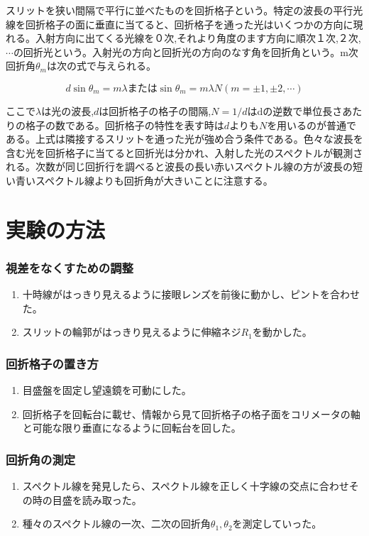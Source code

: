 \documentclass{jsarticle}
\begin{document}
スリットを狭い間隔で平行に並べたものを回折格子という。特定の波長の平行光線を回折格子の面に垂直に当てると、回折格子を通った光はいくつかの方向に現れる。入射方向に出てくる光線を０次,それより角度のます方向に順次１次,２次,$\cdots$の回折光という。入射光の方向と回折光の方向のなす角を回折角という。m次回折角$\theta_m$は次の式で与えられる。

\begin{equation}
    d\sin{\theta_m} = m\lambda または \sin{\theta_m} = m\lambda N (m = \pm 1,\pm 2, \cdots)
\end{equation}

ここで$\lambda$は光の波長,$d$は回折格子の格子の間隔,$N = 1/d$はdの逆数で単位長さあたりの格子の数である。回折格子の特性を表す時は$d$よりも$N$を用いるのが普通である。上式は隣接するスリットを通った光が強め合う条件である。色々な波長を含む光を回折格子に当てると回折光は分かれ、入射した光のスペクトルが観測される。次数が同じ回折行を調べると波長の長い赤いスペクトル線の方が波長の短い青いスペクトル線よりも回折角が大きいことに注意する。



\section{実験の方法}

\subsubsection{視差をなくすための調整}
\begin{enumerate}
    \item 十時線がはっきり見えるように接眼レンズを前後に動かし、ピントを合わせた。
    \item スリットの輪郭がはっきり見えるように伸縮ネジ$R_1$を動かした。
\end{enumerate}

\subsubsection{回折格子の置き方}
\begin{enumerate}
    \item 目盛盤を固定し望遠鏡を可動にした。
    \item 回折格子を回転台に載せ、情報から見て回折格子の格子面をコリメータの軸と可能な限り垂直になるように回転台を回した。
\end{enumerate}

\subsubsection{回折角の測定}
\begin{enumerate}
    \item スペクトル線を発見したら、スペクトル線を正しく十字線の交点に合わせその時の目盛を読み取った。
    \item 種々のスペクトル線の一次、二次の回折角$\theta_1,\theta_2$を測定していった。
\end{enumerate}
\end{document}
